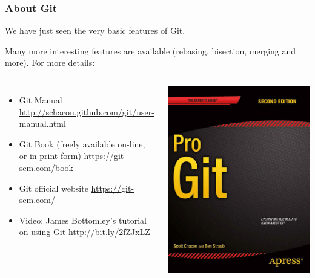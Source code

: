 \begin{frame}
  \frametitle{About Git}
  We have just seen the very basic features of Git.

  Many more interesting features are available (rebasing,
  bisection, merging and more). For more details:
  \begin{columns}
    \begin{itemize}
    \item Git Manual
      \newline \url{http://schacon.github.com/git/user-manual.html}
    \item Git Book (freely available on-line, or in print form)
      \newline \url{https://git-scm.com/book}
    \item Git official website
      \newline \url{https://git-scm.com/}
    \item Video: James Bottomley's tutorial on using Git
      \newline \url{http://bit.ly/2fZJxLZ}
    \end{itemize}
    \includegraphics[height=0.45\textheight]{slides/kernel-git-content/progit2.png}
  \end{columns}
\end{frame}
